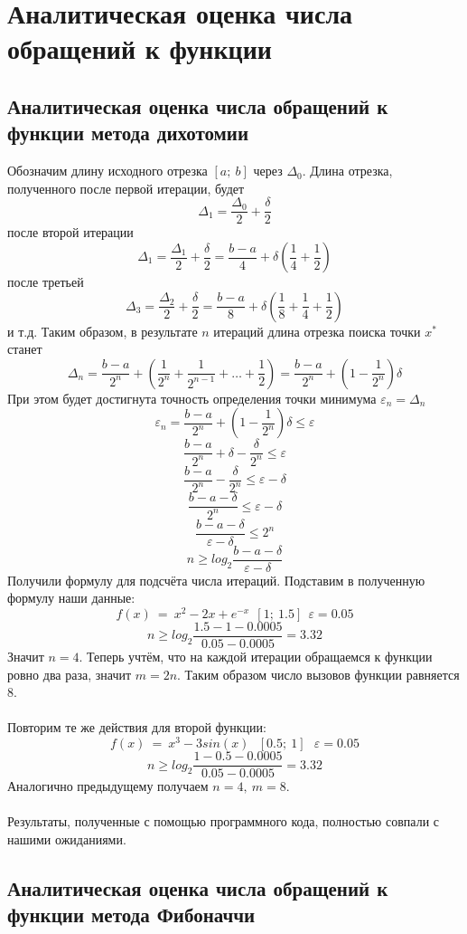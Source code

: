 \documentclass{article}
\begin{document}
\section{Аналитическая оценка числа обращений к функции}

\subsection{Аналитическая оценка числа обращений к функции метода дихотомии}
\noindent Обозначим длину исходного отрезка $[a;~b]$ через $\Delta_0$. Длина отрезка, полученного после первой итерации, будет $$\Delta_1=\frac{\Delta_0}{2}+\frac{\delta}{2}$$ после второй итерации $$\Delta_1=\frac{\Delta_1}{2}+\frac{\delta}{2}=\frac{b-a}{4}+\delta(\frac{1}{4}+\frac{1}{2})$$ после третьей $$\Delta_3=\frac{\Delta_2}{2}+\frac{\delta}{2}=\frac{b-a}{8}+\delta(\frac{1}{8}+\frac{1}{4}+\frac{1}{2})$$ и т.д.
Таким образом, в результате $n$ итераций длина отрезка поиска точки $x^{*}$ станет $$\Delta_n=\frac{b-a}{2^n}+(\frac{1}{2^n}+\frac{1}{2^{n-1}}+\dots +\frac{1}{2})=\frac{b-a}{2^n}+(1-\frac{1}{2^n})\delta$$
При этом будет достигнута точность определения точки минимума $\varepsilon_n=\Delta_n$
$$\varepsilon_n=\frac{b-a}{2^n}+(1-\frac{1}{2^n})\delta \le \varepsilon$$
$$\frac{b-a}{2^n}+\delta-\frac{\delta}{2^n} \le \varepsilon$$
$$\frac{b-a}{2^n}-\frac{\delta}{2^n} \le \varepsilon -\delta$$
$$\frac{b-a-\delta}{2^n} \le \varepsilon -\delta$$
$$\frac{b-a-\delta}{\varepsilon -\delta} \le 2^n$$
$$n \ge log_2\frac{b-a-\delta}{\varepsilon-\delta}$$
Получили формулу для подсчёта числа итераций. 
Подставим в полученную формулу наши данные:
$$f(x)~=~x^{2}-2x+e^{-x}~~[1;~1.5]~~\varepsilon=0.05$$
$$n \ge log_2\frac{1.5-1-0.0005}{0.05-0.0005}=3.32$$
Значит $n=4$. Теперь учтём, что на каждой итерации обращаемся к функции ровно два раза, значит $m=2n$. Таким образом число вызовов функции равняется 8. \\\\
Повторим те же действия для второй функции: 
$$f(x)~=~x^{3}-3sin(x)~~~[0.5;~1]~~~\varepsilon=0.05 $$
$$n \ge log_2\frac{1-0.5-0.0005}{0.05-0.0005}=3.32$$
Аналогично предыдущему получаем $n = 4,~m = 8.$
\\\\
Результаты, полученные с помощью программного кода, полностью совпали с нашими ожиданиями.

\subsection{Аналитическая оценка числа обращений к функции метода Фибоначчи}
\end{document}
